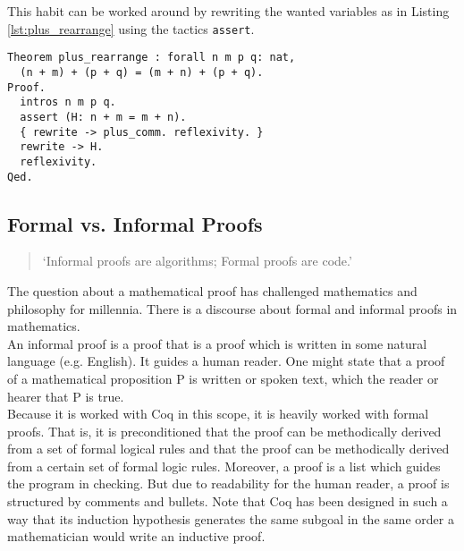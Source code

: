 This habit can be worked around by rewriting the wanted variables as in Listing \ref{lst:plus_rearrange} using the tactics \lstinline!assert!. 

\begin{lstlisting}[caption = \lstinline!plus_rearrange!, label = lst:plus_rearrange]
Theorem plus_rearrange : forall n m p q: nat,
  (n + m) + (p + q) = (m + n) + (p + q).
Proof.
  intros n m p q.
  assert (H: n + m = m + n).
  { rewrite -> plus_comm. reflexivity. }
  rewrite -> H. 
  reflexivity.  
Qed.
\end{lstlisting}


\subsection{Formal vs. Informal Proofs}
\label{ForamlVSInforamlProofs}

\begin{quote}
`Informal proofs are algorithms; Formal proofs are code.'
\end{quote}
The question about a mathematical proof has challenged mathematics and philosophy for millennia.
There is a discourse about formal and informal proofs in mathematics. \\
An informal proof is a proof that is a proof which is written in some natural language (e.g. English).
It guides a human reader. 
One might state that a proof of a mathematical proposition P is written or spoken  text, which  the reader or hearer that P is true.\\ 
Because it is worked with Coq in this scope, it is heavily worked with formal proofs.
That is, it is preconditioned that the proof can be methodically derived from a set of formal logical rules and that the proof can be methodically derived from a certain set of formal logic rules.
Moreover, a proof is a list which guides the program in checking. 
But due to readability for the human reader, a proof is structured by comments and bullets.
Note that Coq has been designed in such a way that its induction hypothesis generates the same subgoal in the same order a mathematician would write an inductive proof.                                                                                            









